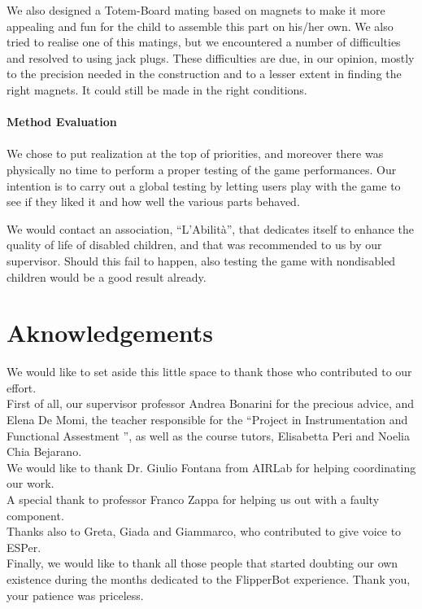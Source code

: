 \documentclass[a4paper,twoside]{book}
\begin{document}
We also designed a Totem-Board mating based on magnets to make it more appealing and fun for the child to assemble this part on his/her own. We also tried to realise one of this matings, but we encountered a number of difficulties and resolved to using jack plugs. These difficulties are due, in our opinion, mostly to the precision needed in the construction and  to a lesser extent in finding the right magnets. It could still be made in the right conditions.
\\
\\
\textbf{Method Evaluation}
\\
\\
We chose to put realization at the top of priorities, and moreover there was physically no time to perform a proper testing of the game performances. Our intention is to carry out a global testing by letting users play with the game to see if they liked it and how well the various parts behaved.

We would contact an association, \textquotedblleft L'Abilit\`{a}\textquotedblright , that dedicates itself to enhance the quality of life of disabled children, and that was recommended to us by our supervisor. Should this fail to happen, also testing the game with non\textendash disabled children would be a good result already.

\chapter{Aknowledgements}

We would like to set aside this little space to thank those who contributed to our effort.
\\
First of all, our supervisor professor Andrea Bonarini for the precious advice, and Elena De Momi, the teacher responsible for the \textquotedblleft Project in Instrumentation and Functional Assestment \textquotedblright, as well as the course tutors, Elisabetta Peri and Noelia Chia Bejarano.
\\
We would like to thank Dr. Giulio Fontana from AIRLab for helping coordinating our work.
\\
A special thank to professor Franco Zappa for helping us out with a faulty component.
\\
Thanks also to Greta, Giada and Giammarco, who contributed to give voice to ESPer.
\\
Finally, we would like to thank all those people that started doubting our own existence during the months dedicated to the FlipperBot experience. Thank you, your patience was priceless.
\end{document}
